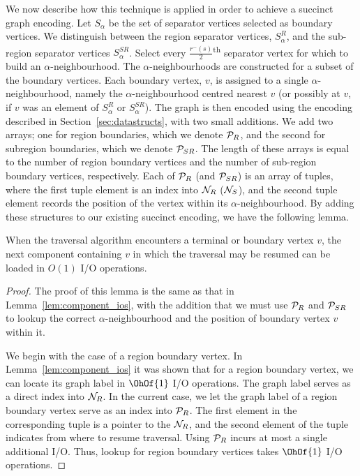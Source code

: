 {We now describe how this technique is applied in order to achieve a succinct graph
encoding. 
Let $S_\alpha$ be the set of separator vertices selected as boundary
vertices.
We distinguish between the region separator vertices, 
$S^{R}_\alpha$, and the sub-region separator vertices $S^{SR}_\alpha$.
Select every $\frac{r^{-}(s)}{2}$\textsuperscript{th} separator vertex 
for which to build an $\alpha$-neighbourhood. 
The $\alpha$-neighbourhoods are constructed for a subset of 
the boundary vertices.
Each boundary vertex, $v$, is assigned to a single $\alpha$-neighbourhood, namely
the $\alpha$-neighbourhood centred nearest $v$ (or possibly at
$v$, if $v$ was an element of $S^{R}_\alpha$ or $S^{SR}_\alpha$). 
The graph is then encoded using the encoding described in 
Section~\ref{sec:datastructs}, with two small additions.
We add two arrays; one for region boundaries, which we denote 
$\mathcal{P}_R$, and the second for subregion boundaries,
which we denote $\mathcal{P}_{SR}$.
The length of these arrays is equal to the number of region boundary 
vertices and the number of sub-region boundary vertices, respectively.
Each of $\mathcal{P}_R$ (and $\mathcal{P}_{SR}$) is an array of tuples, where
the first tuple element is an index into $\mathcal{N}_R$ ($\mathcal{N}_S$), 
and the second tuple element records the position of the vertex within
its $\alpha$-neighbourhood. 
By adding these structures to our existing succinct encoding, we have the
 following lemma.

\begin{lemma}
\label{lem:ptable_ios}
When the traversal algorithm encounters a terminal or boundary
vertex $v$, the next component containing $v$ in which the traversal
may be resumed can be loaded in $O(1)$ I/O operations.
\end{lemma}

\begin{proof}
The proof of this lemma is the same as that in 
Lemma~\ref{lem:component_ios}, with the addition that we must
use $\mathcal{P}_R$ and $\mathcal{P}_{SR}$ to lookup the correct 
$\alpha$-neighbourhood and the position of boundary vertex $v$
within it.

We begin with the case of a region boundary vertex.
In Lemma~\ref{lem:component_ios} it was shown that for a region
boundary vertex, we can locate its graph label in $\OhOf{1}$ I/O
operations.
The graph label serves as a direct index into $\mathcal{N}_R$.
In the current case, we let the graph label of a region boundary
vertex serve as an index into $\mathcal{P}_R$.
The first element in the corresponding tuple is a pointer to the
$\mathcal{N}_R$, and the second element of the tuple indicates from where
to resume traversal.
Using $\mathcal{P}_R$ incurs at most a single additional I/O.
Thus, lookup for region boundary vertices takes $\OhOf{1}$ I/O 
operations.


\end{proof}}
